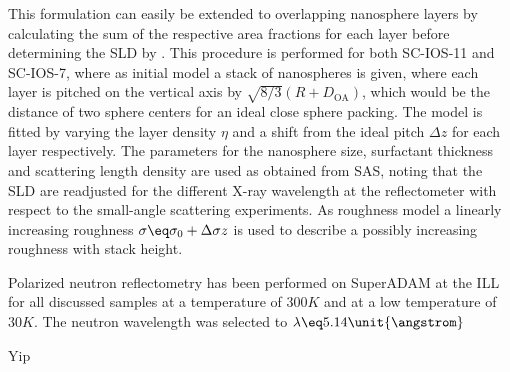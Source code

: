 \documentclass[\main/dresen_thesis.tex]{subfiles}
\begin{document}
    This formulation can easily be extended to overlapping nanosphere layers by calculating the sum of the respective area fractions for each layer before determining the SLD by .
    This procedure is performed for both SC-IOS-11 and SC-IOS-7, where as initial model a stack of nanospheres is given, where each layer is pitched on the vertical axis by $\sqrt{8/3} (R + D_\mathrm{OA})$, which would be the distance of two sphere centers for an ideal close sphere packing.
    The model is fitted by varying the layer density $\eta$ and a shift from the ideal pitch $\Delta z$ for each layer respectively.
    The parameters for the nanosphere size, surfactant thickness and scattering length density are used as obtained from SAS, noting that the SLD are readjusted for the different X-ray wavelength at the reflectometer with respect to the small-angle scattering experiments.
    As roughness model a linearly increasing roughness $\sigma \eq \sigma_0 + \Delta \sigma z$ is used to describe a possibly increasing roughness with stack height.


    Polarized neutron reflectometry has been performed on SuperADAM at the ILL for all discussed samples at a temperature of $300 \unit{K}$ and at a low temperature of $30 \unit{K}$.
    The neutron wavelength was selected to $\lambda \eq 5.14 \unit{\angstrom}$
  
    Yip
\end{document}
